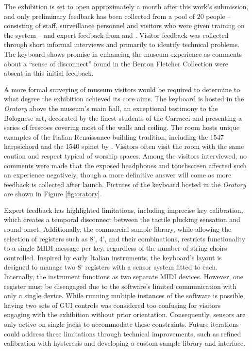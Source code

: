 The exhibition is set to open approximately a month after this work's
submission, and only preliminary feedback has been collected from a pool of 20
people -- consisting of staff, surveillance personnel and visitors who were
given training on the system -- and expert feedback from 
and . Visitor feedback was collected through short informal
interviews and primarily to identify technical problems. The keyboard shows
promise in enhancing the museum experience as comments about a ``sense of
disconnect'' found in the Benton Fletcher Collection \cite{McAlpine2014} were
absent in this initial feedback.

A more formal surveying of museum visitors would be required to determine to
what degree the exhibition achieved its core aims. The keyboard is hosted in the
\emph{Oratory} above the museum's main hall, an exceptional testimony to the
Bolognese art, decorated by the finest students of the Carracci and presenting a
series of frescoes covering most of the walls and ceiling. The room hosts unique
examples of the Italian Renaissance building tradition, including the 1547
harpsichord and the 1540 spinet by . Visitors often
visit the room with the same caution and respect typical of worship spaces.
Among the visitors interviewed, no comments were made that the exposed
headphones and touchscreen affected such an experience negatively, though a more
definitive answer will come as more feedback is collected after launch. Pictures
of the keyboard hosted in the \emph{Oratory} are shown in Figure
\ref{fig:oratory}.

Expert feedback has highlighted limitations, including imprecise key
calibration, which creates a temporal disconnect between the tactile plucking
sensation and sound onset. Additionally, the commercial sample library, while
allowing the selection of registers such as 8', 4', and their combinations,
restricts functionality to a single MIDI message per key, regardless of the
number of string choirs controlled. Inspired by early Italian instruments, the
keyboard's layout is designed to manage two 8' registers with a sensor system
fitted to each. Internally, the instrument functions as two separate MIDI
devices. However, one register must be disengaged due to the software's limited
communication with only a single device. While running multiple instances of the
software is possible, having two sets of GUI controls was considered too
confusing for visitors engaging with the exhibition without prior orientation.
Consequently, sensors are only active on single jacks to accommodate these
constraints. Future iterations could address these limitations through technical
improvements, such as refined calibration with hysteresis and developing a
custom sample library and interface.

